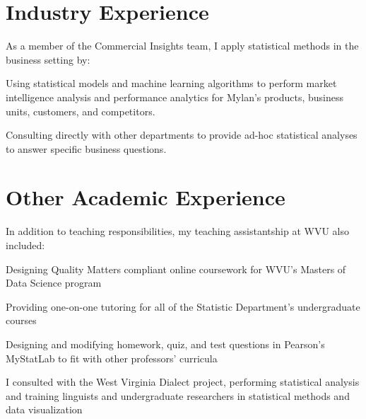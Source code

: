 \documentclass[letterpaper]{deedy-resume} %
\begin{document}
\sectionspace

\section{Industry Experience}
As a member of the Commercial Insights team, I apply statistical methods in the business setting by:
\begin{tightitemize}
\item Using statistical models and machine learning algorithms to
  perform market intelligence analysis and performance analytics for
  Mylan's products, business units, customers, and competitors.
\item Consulting directly with other departments to provide ad-hoc
  statistical analyses to answer specific business questions. 
\end{tightitemize}

\sectionspace

\section{Other Academic Experience}
In addition to teaching responsibilities, my teaching assistantship at 
WVU also included:
\begin{tightitemize}
\item Designing Quality Matters compliant online coursework for WVU's Masters of Data Science program
\item Providing one-on-one tutoring for all of the Statistic Department's undergraduate courses
\item Designing and modifying homework, quiz, and test questions in Pearson's MyStatLab to fit with other professors' curricula
\end{tightitemize}

\vspace{8pt}

I consulted with the West Virginia Dialect project, performing statistical analysis and training
linguists and undergraduate researchers in statistical methods and data visualization
\end{document}
